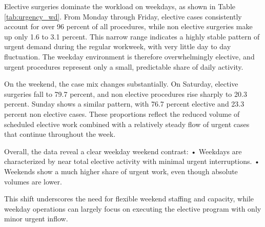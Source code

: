 \documentclass[
]{article}
\begin{document}
Elective surgeries dominate the workload on weekdays, as shown in Table
\ref{tab:urgency_wd}. From Monday through Friday, elective cases
consistently account for over 96 percent of all procedures, while non
elective surgeries make up only 1.6 to 3.1 percent. This narrow range
indicates a highly stable pattern of urgent demand during the regular
workweek, with very little day to day fluctuation. The weekday
environment is therefore overwhelmingly elective, and urgent procedures
represent only a small, predictable share of daily activity.

On the weekend, the case mix changes substantially. On Saturday,
elective surgeries fall to 79.7 percent, and non elective procedures
rise sharply to 20.3 percent. Sunday shows a similar pattern, with 76.7
percent elective and 23.3 percent non elective cases. These proportions
reflect the reduced volume of scheduled elective work combined with a
relatively steady flow of urgent cases that continue throughout the
week.

Overall, the data reveal a clear weekday weekend contrast: • Weekdays
are characterized by near total elective activity with minimal urgent
interruptions. • Weekends show a much higher share of urgent work, even
though absolute volumes are lower.

This shift underscores the need for flexible weekend staffing and
capacity, while weekday operations can largely focus on executing the
elective program with only minor urgent inflow.
\end{document}
